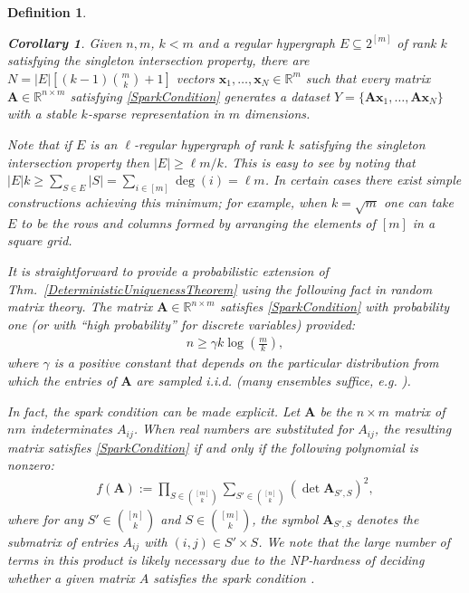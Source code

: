 \documentclass[9pt,twocolumn]{pnas-new}
\newtheorem{proposition}{Proposition}
\newtheorem{definition}{Definition}
\newtheorem{corollary}{Corollary}
\begin{document}
\begin{definition}

\begin{corollary}\label{DeterministicUniquenessCorollary}
Given $n, m$, $k < m$ and a regular hypergraph $E \subseteq 2^{[m]}$ of rank $k$ satisfying the singleton intersection property, there are $N =  |E| \left[ (k-1){m \choose k}+1 \right]$ vectors \mbox{$\mathbf{x}_1, \ldots, \mathbf{x}_N \in \mathbb{R}^m$} such that every matrix $\mathbf{A} \in \mathbb{R}^{n \times m}$ satisfying \eqref{SparkCondition} generates a dataset $Y = \{\mathbf{A}\mathbf{x}_1, \ldots, \mathbf{A}\mathbf{x}_N\}$ with a stable $k$-sparse representation in $m$ dimensions.
\end{corollary}

Note that if $E$ is an $\ell$-regular hypergraph of rank $k$ satisfying the singleton intersection property then $|E| \geq \ell m/k$.
This is easy to see by noting that $|E|k \geq \sum_{S \in E}|S| = \sum_{i \in [m]} \deg(i) = \ell m$. In certain cases there exist simple constructions achieving this minimum; for example, when $k = \sqrt{m}$ one can take $E$ to be the rows and columns formed by arranging the elements of $[m]$ in a square grid.

It is straightforward to provide a probabilistic extension of Thm.~\ref{DeterministicUniquenessTheorem} using the following fact in random matrix theory.  The matrix $\mathbf{A} \in \mathbb{R}^{n \times m}$ satisfies \eqref{SparkCondition} with probability one (or with ``high probability'' for discrete variables) 
provided:
\begin{align}\label{CScondition}
n \geq \gamma k\log\left(\frac{m}{k}\right),
\end{align}
%
where $\gamma$ is a positive constant that depends on the particular distribution from which the entries of $\mathbf{A}$ are sampled i.i.d. (many ensembles suffice, e.g. \cite[Sec.~4]{Baraniuk08}). 

In fact, the spark condition can be made explicit.  Let $\mathbf{A}$  be the $n \times m$ matrix of $nm$ indeterminates $A_{ij}$. When real numbers are substituted for $A_{ij}$, the resulting matrix satisfies \eqref{SparkCondition} if and only if the following polynomial is nonzero:
\begin{align*}
f(\mathbf{A}) := \prod_{S \in {[m] \choose k}} \sum_{S' \in {[n] \choose k}} (\det \mathbf{A}_{S',S})^2,
\end{align*}
%
where for any $S' \in {[n] \choose k}$ and $S \in {[m] \choose k}$, the symbol $\mathbf{A}_{S',S}$ denotes the submatrix of entries $A_{ij}$ with $(i,j) \in S' \times S$.   We note that the large number of terms in this product is likely necessary due to the NP-hardness of deciding whether a given matrix $A$ satisfies the spark condition \cite{tillmann2014computational}.


\end{definition}
\end{document}
